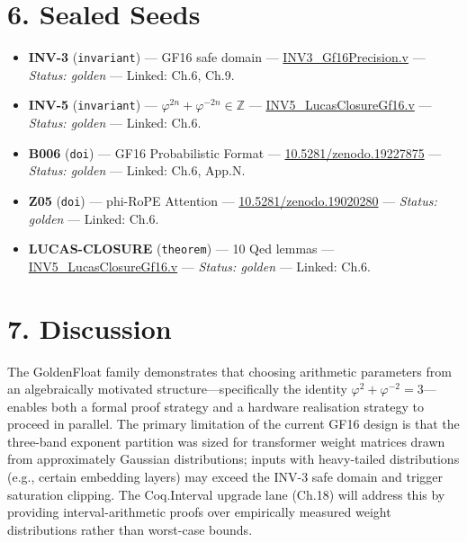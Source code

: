 \section{6. Sealed Seeds}\label{fa_06:sealed-seeds}

\begin{itemize}
\item
  \textbf{INV-3} (\texttt{invariant}) --- GF16
  safe domain ---
  \href{https://github.com/gHashTag/t27/blob/feat/canonical-coq-home/proofs/canonical/igla/INV3_Gf16Precision.v}{INV3\_Gf16Precision.v}
  --- \emph{Status: golden} --- Linked: Ch.6,
  Ch.9.
\item
  \textbf{INV-5} (\texttt{invariant}) ---
  \(\varphi^{2n}+\varphi^{-2n} \in \mathbb{Z}\)
  ---
  \href{https://github.com/gHashTag/t27/blob/feat/canonical-coq-home/proofs/canonical/igla/INV5_LucasClosureGf16.v}{INV5\_LucasClosureGf16.v}
  --- \emph{Status: golden} --- Linked: Ch.6.
\item
  \textbf{B006} (\texttt{doi}) --- GF16
  Probabilistic Format ---
  \href{https://doi.org/10.5281/zenodo.19227875}{10.5281/zenodo.19227875}
  --- \emph{Status: golden} --- Linked: Ch.6,
  App.N.
\item
  \textbf{Z05} (\texttt{doi}) --- phi-RoPE
  Attention ---
  \href{https://doi.org/10.5281/zenodo.19020280}{10.5281/zenodo.19020280}
  --- \emph{Status: golden} --- Linked: Ch.6.
\item
  \textbf{LUCAS-CLOSURE} (\texttt{theorem}) --- 10
  Qed lemmas ---
  \href{https://github.com/gHashTag/t27/blob/feat/canonical-coq-home/proofs/canonical/igla/INV5_LucasClosureGf16.v}{INV5\_LucasClosureGf16.v}
  --- \emph{Status: golden} --- Linked: Ch.6.
\end{itemize}

\section{7. Discussion}\label{fa_06:discussion}

The GoldenFloat family demonstrates that choosing
arithmetic parameters from an algebraically
motivated structure---specifically the identity
\(\varphi^2+\varphi^{-2}=3\)---enables both a
formal proof strategy and a hardware realisation
strategy to proceed in parallel. The primary
limitation of the current GF16 design is that the
three-band exponent partition was sized for
transformer weight matrices drawn from
approximately Gaussian distributions; inputs with
heavy-tailed distributions (e.g., certain
embedding layers) may exceed the INV-3 safe domain
and trigger saturation clipping. The Coq.Interval
upgrade lane (Ch.18) will address this by
providing interval-arithmetic proofs over
empirically measured weight distributions rather
than worst-case bounds.

